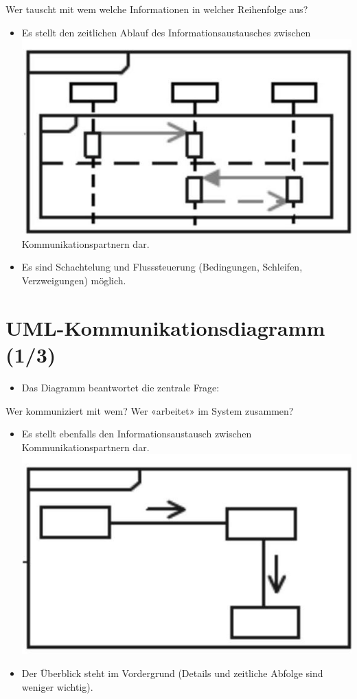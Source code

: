 \documentclass[10pt]{article}
\begin{document}
Wer tauscht mit wem welche Informationen in welcher Reihenfolge aus?

\begin{itemize}
  \item Es stellt den zeitlichen Ablauf des Informationsaustausches zwischen\\
\includegraphics[width=\linewidth]{images/2025_01_02_787afb9584031d2940deg-15} Kommunikationspartnern dar.
  \item Es sind Schachtelung und Flusssteuerung (Bedingungen, Schleifen, Verzweigungen) möglich.
\end{itemize}

\section*{UML-Kommunikationsdiagramm (1/3)}
\begin{itemize}
  \item Das Diagramm beantwortet die zentrale Frage:
\end{itemize}

Wer kommuniziert mit wem? Wer «arbeitet» im System zusammen?

\begin{itemize}
  \item Es stellt ebenfalls den Informationsaustausch zwischen Kommunikationspartnern dar.\\
\includegraphics[width=\linewidth]{images/2025_01_02_787afb9584031d2940deg-16}
  \item Der Überblick steht im Vordergrund (Details und zeitliche Abfolge sind weniger wichtig).
\end{itemize}
\end{document}
